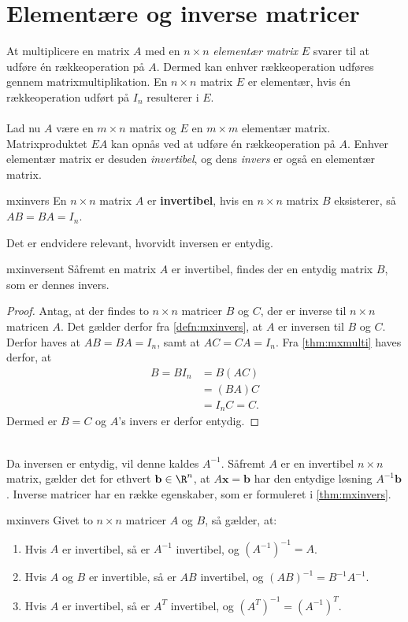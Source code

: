 \section{Elementære og inverse matricer}
At multiplicere en matrix $A$ med en $n \times n$ \textit{elementær matrix} $E$ svarer til at udføre én rækkeoperation på $A$. 
Dermed kan enhver rækkeoperation udføres gennem matrixmultiplikation. 
En $n \times n$ matrix $E$ er elementær, hvis én rækkeoperation udført på $I_n$ resulterer i $E$. 
\\\\
Lad nu $A$ være en $m \times n$ matrix og $E$ en $m \times m$ elementær matrix.
Matrixproduktet $EA$ kan opnås ved at udføre én rækkeoperation på $A$. 
Enhver elementær matrix er desuden \textit{invertibel}, og dens \textit{invers} er også en elementær matrix. 
%
\begin{defn}{}{mxinvers}
En $n \times n$ matrix $A$ er \textbf{invertibel}, hvis en $n \times n$ matrix $B$ eksisterer, så $AB=BA=I_n$. 
\end{defn}
\noindent
%
Det er endvidere relevant, hvorvidt inversen er entydig.
\begin{thm}{}{mxinversent}
Såfremt en matrix $A$ er invertibel, findes der en entydig matrix $B$, som er dennes invers.
\end{thm}
%
\begin{proof}
Antag, at der findes to $n \times n$ matricer  $B$ og $C$, der er inverse til $n \times n$ matricen $A$.
Det gælder derfor fra \ref{defn:mxinvers}, at $A$ er inversen til $B$ og $C$.
Derfor haves at $AB=BA=I_{n}$, samt at $AC=CA=I_{n}$. 
Fra \ref{thm:mxmulti} haves derfor, at
\begin{align*}
B=BI_n &=B(AC) \\
&=(BA)C \\
&=I_nC=C.
\end{align*} 
Dermed er $B=C$ og $A$'s invers er derfor entydig.
\end{proof} \\
%
Da inversen er entydig, vil denne kaldes $A^{-1}$.
Såfremt $A$ er en invertibel $n \times n$ matrix, gælder det for ethvert $\mathbf{b} \in \R^n$, at $A\textbf{x}=\mathbf{b}$ har den entydige løsning $A^{-1}\mathbf{b}$.
Inverse matricer har en række egenskaber, som er formuleret i \ref{thm:mxinvers}. 
\newpage
%
\begin{thm}{}{mxinvers}
Givet to $n \times n$ matricer $A$ og $B$, så gælder, at:
\begin{enumerate}[label=(\alph*)]
\item Hvis $A$ er invertibel, så er $A^{-1}$ invertibel, og $(A^{-1})^{-1}=A$.
\item Hvis $A$ og $B$ er invertible, så er $AB$ invertibel, og $(AB)^{-1}=B^{-1}A^{-1}$.
\item Hvis $A$ er invertibel, så er $A^T$ invertibel, og $(A^T)^{-1}=(A^{-1})^T$.
\end{enumerate}
\end{thm}
